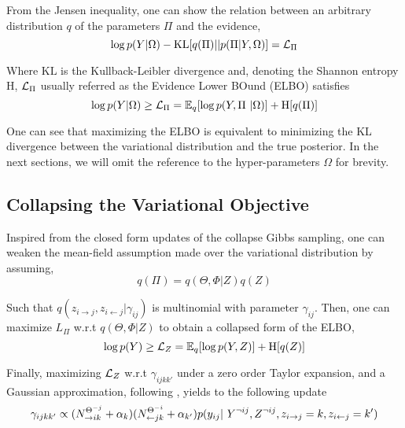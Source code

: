 From the Jensen inequality, one can show the relation between an arbitrary distribution $q$ of the parameters $\Pi$ and the evidence, 
\begin{equation*}
\log p(Y | \Omega) - \textrm{KL}[q(\Pi)||p(\Pi | Y, \Omega)] = \mathcal{L}_\Pi
\end{equation*}

Where $\textrm{KL}$ is the Kullback-Leibler divergence and, denoting the Shannon entropy $\textrm{H}$, $\mathcal{L}_\Pi$ usually referred as the Evidence Lower BOund (ELBO) satisfies
\begin{equation*}
\log p(Y|\Omega) \geq \mathcal{L}_\Pi = \mathbb{E}_{q}[\log p(Y, \Pi\ | \Omega)] + \textrm{H}[q(\Pi)] 
\end{equation*}

One can see that maximizing the ELBO is equivalent to minimizing the KL divergence between the variational distribution and the true posterior.
In the next sections, we will omit the reference to the hyper-parameters $\Omega$ for brevity.

\subsection{Collapsing the Variational Objective}
Inspired from the closed form updates of the collapse Gibbs sampling, one can weaken the mean-field assumption made over the variational distribution by assuming,
\begin{equation*}
q(\Pi) = q(\Theta, \Phi | Z) q(Z)
\end{equation*}

Such that $q(z_{i \rightarrow j}, z_{i \leftarrow j}|\gamma_{ij})$ is multinomial with parameter $\gamma_{ij}$. Then, one can maximize $L_\Pi$ w.r.t $q(\Theta, \Phi | Z)$ to obtain a collapsed form of the ELBO,
\begin{equation*}
\log p(Y) \geq \mathcal{L}_Z = \mathbb{E}_{q}[\log p(Y, Z)] + \textrm{H}[q(Z)]
\end{equation*}

Finally, maximizing $\mathcal{L}_Z$ w.r.t $\gamma_{ijkk'}$ under a zero order Taylor expansion, and a Gaussian approximation, following \cite{teh2006collapsed}\cite{asuncion2009smoothing}, yields to the following update
\begin{equation} \label{eq:maximization}
\gamma_{ijkk'} \propto (N_{\rightarrow ik}^{\Theta^{-j}} + \alpha_k) (N_{\leftarrow jk}^{\Theta^{-i}} + \alpha_{k'}) p(y_{ij} | Y^{\neg ij}, Z^{\neg ij}, \zij=k, \zji=k')
\end{equation}

